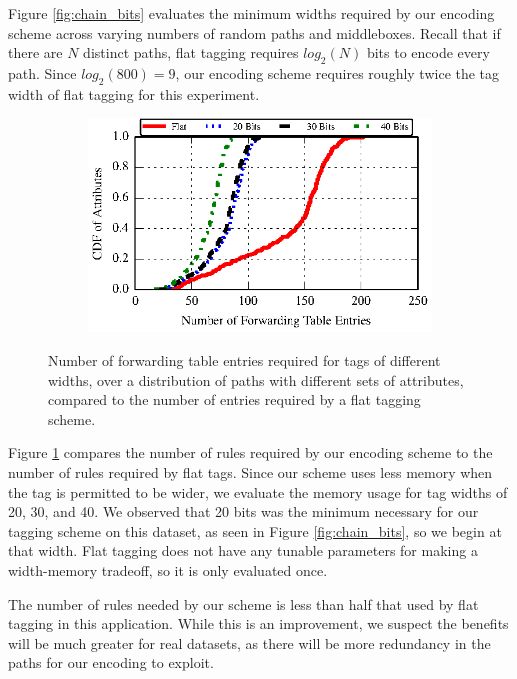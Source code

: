 Figure \ref{fig:chain_bits} evaluates the minimum widths required by our encoding scheme across varying numbers of random paths and middleboxes. Recall that if there are $N$ distinct paths, flat tagging requires $log_2(N)$ bits to encode every path. Since $log_2(800) = 9$, our encoding scheme requires roughly twice the tag width of flat tagging for this experiment. 

\begin{figure}[t!] 
\begin{minipage}{1\linewidth}
\begin{subfigure}[b]{0.96\linewidth}
\includegraphics[width=\linewidth]{figures/attr_cdf}
\end{subfigure} 
\end{minipage} 
\caption{Number of forwarding table entries required for tags of
  different widths, over a distribution of paths with different sets of
  attributes, compared to the number of entries required by a flat tagging scheme.}
\label{fig:chain_rules}
\end{figure}

Figure \ref{fig:chain_rules} compares the number of rules required by
our encoding scheme to the number of rules required by flat tags. Since
our scheme uses less memory when the tag is permitted to be wider, we
evaluate the memory usage for tag widths of 20, 30, and 40. We observed
that 20 bits was the minimum necessary for our tagging scheme on this
dataset, as seen in Figure \ref{fig:chain_bits}, so we begin at that
width. Flat tagging does not have any tunable parameters for making a
width-memory tradeoff, so it is only evaluated once. 

The number of rules needed by our scheme is less than half that used by flat tagging in this application. While this is an improvement, we suspect the benefits will be much greater for real datasets, as there will be more redundancy in the paths for our encoding to exploit.
